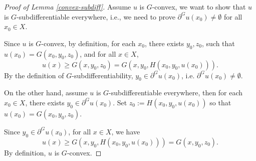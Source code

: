 \documentclass[a4paper, 11pt]{amsart}
\numberwithin{equation}{section}
\theoremstyle{plain}
\theoremstyle{definition}
\theoremstyle{remark}
\begin{document}
\begin{proof}[Proof of Lemma \ref{convex-subdiff}]
%
%
%
%
%

	Assume $u$ is $G$-convex, we want to show that $u$ is $G$-subdifferentiable everywhere, i.e., we need to prove  $\partial^G u(x_0)\neq \emptyset$ for all $x_0\in X$.
	
	Since $u$ is $G$-convex, by definition, for each $x_0$, there exists $ y_0, z_0$, such that $u(x_0) = G(x_0,y_0,z_0)$, and for all  $ x \in X$, 
	\begin{equation*}
	u(x)\ge G(x, y_0, z_0) = G(x, y_0, H(x_0,y_0,u(x_0))).
	\end{equation*}
	By the definition of $G$-subdifferentiability, $y_0 \in \partial^G u(x_0)$, i.e. $\partial^G u(x_0) \neq \emptyset$.
	
	On the other hand, assume $u$ is $G$-subdifferentiable everywhere, then for each $ x_0 \in X$,  there exists $ y_0 \in \partial^G u(x_0)$. Set $z_0:=H(x_0,y_0,u(x_0))$ so that $u(x_0) = G(x_0, y_0, z_0)$.
	
	Since $y_0\in \partial^G u(x_0)$, for all $x\in X$, we have 
	\begin{equation*}
	u(x)\ge G(x,y_0,H(x_0,y_0,u(x_0))) = G(x,y_0,z_0).
	\end{equation*}
	By definition, $u$ is $G$-convex.
\end{proof}
\end{document}
